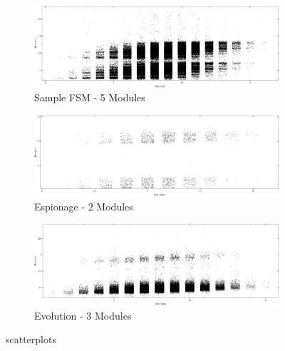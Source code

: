 


\begin{figure}[th]
\centering
\begin{subfigure}{\textwidth}
  \centering\includegraphics[width=\textwidth]{figures/FSM.png}
  \caption*{Sample FSM - 5 Modules}
\end{subfigure}

\begin{subfigure}{\textwidth}
  \centering\includegraphics[width=\textwidth]{figures/Espionage.png}
  \caption*{Espionage - 2 Modules}
\end{subfigure}


\begin{subfigure}{\textwidth}
  \centering\includegraphics[width=\textwidth]{figures/Evolution.png}
  \caption*{Evolution - 3 Modules}
 \end{subfigure}
\caption{scatterplots}
\label{fig:scatterplots1}
\end{figure}

